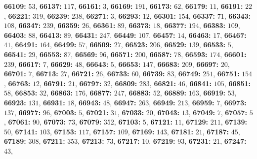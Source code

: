 \textsf{\bfseries 66109:} $53$, \textsf{\bfseries 66137:} $117$, \textsf{\bfseries 66161:} $3$, \textsf{\bfseries 66169:} $191$, \textsf{\bfseries 66173:} $62$, \textsf{\bfseries 66179:} $11$, \textsf{\bfseries 66191:} $22$, \textsf{\bfseries 66221:} $319$, \textsf{\bfseries 66239:} $238$, \textsf{\bfseries 66271:} $3$, \textsf{\bfseries 66293:} $12$, \textsf{\bfseries 66301:} $154$, \textsf{\bfseries 66337:} $71$, \textsf{\bfseries 66343:} $108$, \textsf{\bfseries 66347:} $239$, \textsf{\bfseries 66359:} $26$, \textsf{\bfseries 66361:} $89$, \textsf{\bfseries 66373:} $18$, \textsf{\bfseries 66377:} $194$, \textsf{\bfseries 66383:} $109$, \textsf{\bfseries 66403:} $88$, \textsf{\bfseries 66413:} $89$, \textsf{\bfseries 66431:} $247$, \textsf{\bfseries 66449:} $107$, \textsf{\bfseries 66457:} $14$, \textsf{\bfseries 66463:} $17$, \textsf{\bfseries 66467:} $41$, \textsf{\bfseries 66491:} $164$, \textsf{\bfseries 66499:} $57$, \textsf{\bfseries 66509:} $27$, \textsf{\bfseries 66523:} $206$, \textsf{\bfseries 66529:} $139$, \textsf{\bfseries 66533:} $5$, \textsf{\bfseries 66541:} $29$, \textsf{\bfseries 66553:} $87$, \textsf{\bfseries 66569:} $96$, \textsf{\bfseries 66571:} $200$, \textsf{\bfseries 66587:} $78$, \textsf{\bfseries 66593:} $174$, \textsf{\bfseries 66601:} $239$, \textsf{\bfseries 66617:} $7$, \textsf{\bfseries 66629:} $48$, \textsf{\bfseries 66643:} $5$, \textsf{\bfseries 66653:} $147$, \textsf{\bfseries 66683:} $209$, \textsf{\bfseries 66697:} $20$, \textsf{\bfseries 66701:} $7$, \textsf{\bfseries 66713:} $27$, \textsf{\bfseries 66721:} $26$, \textsf{\bfseries 66733:} $60$, \textsf{\bfseries 66739:} $83$, \textsf{\bfseries 66749:} $251$, \textsf{\bfseries 66751:} $154$, \textsf{\bfseries 66763:} $12$, \textsf{\bfseries 66791:} $21$, \textsf{\bfseries 66797:} $32$, \textsf{\bfseries 66809:} $283$, \textsf{\bfseries 66821:} $46$, \textsf{\bfseries 66841:} $105$, \textsf{\bfseries 66851:} $58$, \textsf{\bfseries 66853:} $32$, \textsf{\bfseries 66863:} $176$, \textsf{\bfseries 66877:} $247$, \textsf{\bfseries 66883:} $52$, \textsf{\bfseries 66889:} $163$, \textsf{\bfseries 66919:} $53$, \textsf{\bfseries 66923:} $131$, \textsf{\bfseries 66931:} $18$, \textsf{\bfseries 66943:} $48$, \textsf{\bfseries 66947:} $263$, \textsf{\bfseries 66949:} $213$, \textsf{\bfseries 66959:} $7$, \textsf{\bfseries 66973:} $137$, \textsf{\bfseries 66977:} $96$, \textsf{\bfseries 67003:} $5$, \textsf{\bfseries 67021:} $31$, \textsf{\bfseries 67033:} $20$, \textsf{\bfseries 67043:} $13$, \textsf{\bfseries 67049:} $7$, \textsf{\bfseries 67057:} $5$, \textsf{\bfseries 67061:} $90$, \textsf{\bfseries 67073:} $73$, \textsf{\bfseries 67079:} $352$, \textsf{\bfseries 67103:} $5$, \textsf{\bfseries 67121:} $11$, \textsf{\bfseries 67129:} $211$, \textsf{\bfseries 67139:} $50$, \textsf{\bfseries 67141:} $103$, \textsf{\bfseries 67153:} $117$, \textsf{\bfseries 67157:} $109$, \textsf{\bfseries 67169:} $143$, \textsf{\bfseries 67181:} $21$, \textsf{\bfseries 67187:} $45$, \textsf{\bfseries 67189:} $308$, \textsf{\bfseries 67211:} $353$, \textsf{\bfseries 67213:} $73$, \textsf{\bfseries 67217:} $10$, \textsf{\bfseries 67219:} $93$, \textsf{\bfseries 67231:} $21$, \textsf{\bfseries 67247:} $43$, 

